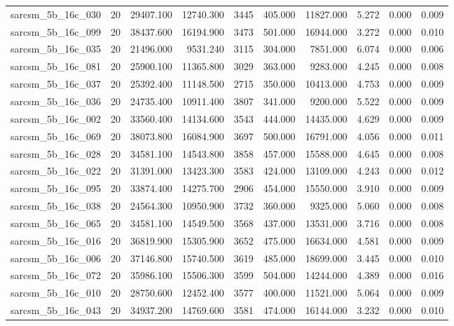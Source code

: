\begin{tabular}{lrrrrrrrrr}
sarcsm\_5b\_16c\_030 & 20 & 29407.100 & 12740.300 & 3445 & 405.000 & 11827.000 & 5.272 & 0.000 & 0.009 \\
sarcsm\_5b\_16c\_099 & 20 & 38437.600 & 16194.900 & 3473 & 501.000 & 16944.000 & 3.272 & 0.000 & 0.010 \\
sarcsm\_5b\_16c\_035 & 20 & 21496.000 & 9531.240 & 3115 & 304.000 & 7851.000 & 6.074 & 0.000 & 0.006 \\
sarcsm\_5b\_16c\_081 & 20 & 25900.100 & 11365.800 & 3029 & 363.000 & 9283.000 & 4.245 & 0.000 & 0.008 \\
sarcsm\_5b\_16c\_037 & 20 & 25392.400 & 11148.500 & 2715 & 350.000 & 10413.000 & 4.753 & 0.000 & 0.009 \\
sarcsm\_5b\_16c\_036 & 20 & 24735.400 & 10911.400 & 3807 & 341.000 & 9200.000 & 5.522 & 0.000 & 0.009 \\
sarcsm\_5b\_16c\_002 & 20 & 33560.400 & 14134.600 & 3543 & 444.000 & 14435.000 & 4.629 & 0.000 & 0.009 \\
sarcsm\_5b\_16c\_069 & 20 & 38073.800 & 16084.900 & 3697 & 500.000 & 16791.000 & 4.056 & 0.000 & 0.011 \\
sarcsm\_5b\_16c\_028 & 20 & 34581.100 & 14543.800 & 3858 & 457.000 & 15588.000 & 4.645 & 0.000 & 0.008 \\
sarcsm\_5b\_16c\_022 & 20 & 31391.000 & 13423.300 & 3583 & 424.000 & 13109.000 & 4.243 & 0.000 & 0.012 \\
sarcsm\_5b\_16c\_095 & 20 & 33874.400 & 14275.700 & 2906 & 454.000 & 15550.000 & 3.910 & 0.000 & 0.009 \\
sarcsm\_5b\_16c\_038 & 20 & 24564.300 & 10950.900 & 3732 & 360.000 & 9325.000 & 5.060 & 0.000 & 0.008 \\
sarcsm\_5b\_16c\_065 & 20 & 34581.100 & 14549.500 & 3568 & 437.000 & 13531.000 & 3.716 & 0.000 & 0.008 \\
sarcsm\_5b\_16c\_016 & 20 & 36819.900 & 15305.900 & 3652 & 475.000 & 16634.000 & 4.581 & 0.000 & 0.009 \\
sarcsm\_5b\_16c\_006 & 20 & 37146.800 & 15740.500 & 3619 & 485.000 & 18699.000 & 3.445 & 0.000 & 0.010 \\
sarcsm\_5b\_16c\_072 & 20 & 35986.100 & 15506.300 & 3599 & 504.000 & 14244.000 & 4.389 & 0.000 & 0.016 \\
sarcsm\_5b\_16c\_010 & 20 & 28750.600 & 12452.400 & 3577 & 400.000 & 11521.000 & 5.064 & 0.000 & 0.009 \\
sarcsm\_5b\_16c\_043 & 20 & 34937.200 & 14769.600 & 3581 & 474.000 & 16144.000 & 3.232 & 0.000 & 0.010 \\

\end{tabular}
